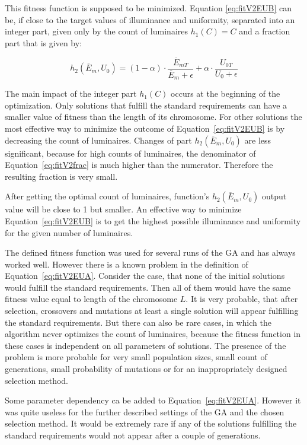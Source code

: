 This fitness function is supposed to be minimized. Equation \ref{eq:fitV2EUB} can be, if close to the target values of illuminance and uniformity, separated into an integer part, given only by the count of luminaires $h_1\left(C\right)= C$ and a fraction part that is given by:

\begin{equation}
\label{eq:fitV2frac}
	h_2\left(\overline{E}_{m}, U_0\right)= \left( 1 - \alpha\right)\cdot\frac{\overline{E}_{mT}}{\overline{E}_{m}+\epsilon} + \alpha\cdot\frac{U_{0T}}{U_0 + \epsilon}
\end{equation}

The main impact of the integer part $h_1\left(C\right)$ occurs at the beginning of the optimization. Only solutions that fulfill the standard requirements can have a smaller value of fitness than the length of its chromosome. For other solutions the most effective way to minimize the outcome of Equation~\ref{eq:fitV2EUB} is by decreasing the count of luminaires. Changes of part $h_2\left(\overline{E}_{m}, U_0\right)$ are less significant, because for high counts of luminaires, the denominator of Equation~\ref{eq:fitV2frac} is much higher than the numerator. Therefore the resulting fraction is very small.

After getting the optimal count of luminaires, function's $h_2\left(\overline{E}_{m}, U_0\right)$ output value will be close to 1 but smaller. An effective way to minimize Equation~\ref{eq:fitV2EUB} is to get the highest possible illuminance and uniformity for the given number of luminaires.

The defined fitness function was used for several runs of the GA and has always worked well. However there is a known problem in the definition of Equation~\ref{eq:fitV2EUA}. Consider the case, that none of the initial solutions would fulfill the standard requirements. Then all of them would have the same  fitness value equal to length of the chromosome $L$. It is very probable, that after selection, crossovers and mutations at least a single solution will appear fulfilling the standard requirements. But there can also be rare cases, in which the algorithm never optimizes the count of luminaires, because the fitness function in these cases is independent on all parameters of solutions. The presence of the problem is more probable for very small population sizes, small count of generations, small probability of mutations or for an inappropriately designed selection method.

Some parameter dependency ca be added to Equation~\ref{eq:fitV2EUA}. However it was quite useless for the further described settings of the GA and the chosen selection method. It would be extremely rare if any of the solutions fulfilling the standard requirements would not appear after a couple of generations.
